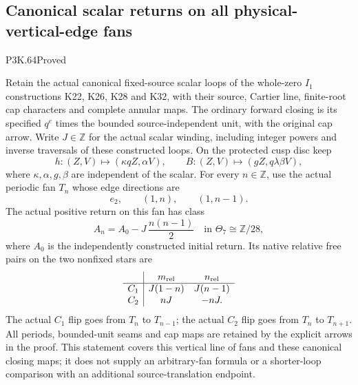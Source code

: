 \subsection{Canonical scalar returns on all physical-vertical-edge fans}
\begin{statement}{P3K.64}{Proved}

Retain the actual canonical fixed-source scalar loops of the whole-zero
\(I_1\) constructions K22, K26, K28 and K32, with their source,
Cartier line, finite-root cap characters and complete annular maps.
The ordinary forward closing is its specified \(q^e\) times the
bounded source-independent unit, with the original cap arrow.
Write \(J\in\mathbb Z\) for the actual scalar winding, including
integer powers and inverse traversals of these constructed loops.
On the protected cusp disc keep
\[
 h:(Z,V)\mapsto(\kappa qZ,\alpha V),\qquad
 B:(Z,V)\mapsto(gZ,q\lambda\beta V),
\]
where \(\kappa,\alpha,g,\beta\) are independent of the scalar.
For every \(n\in\mathbb Z\), use the actual periodic fan \(T_n\)
whose edge directions are
\[
                    e_2,\qquad (1,n),\qquad(1,n-1).
\]
The actual positive return on this fan has class
\[
        A_n=A_0-J\,\frac{n(n-1)}2
                  \quad\text{in }\Theta_7\cong\mathbb Z/28,
 \tag{P3K.64.0}
\]
where \(A_0\) is the independently constructed initial return.
Its native relative free pairs on the two nonfixed stars are
\[
 \begin{array}{c|cc}
  &m_{\rm rel}&n_{\rm rel}\\ \hline
 C_1&J(1-n)&J(n-1)\\
 C_2&nJ&-nJ.
 \end{array}
\]
The actual \(C_1\) flip goes from \(T_n\) to \(T_{n-1}\);
the actual \(C_2\) flip goes from \(T_n\) to \(T_{n+1}\).
All periods, bounded-unit seams and cap maps are retained by
the explicit arrows in the proof. This statement covers this
vertical line of fans and these canonical closing maps; it
does not supply an arbitrary-fan formula or a shorter-loop
comparison with an additional source-translation endpoint.
\end{statement}
